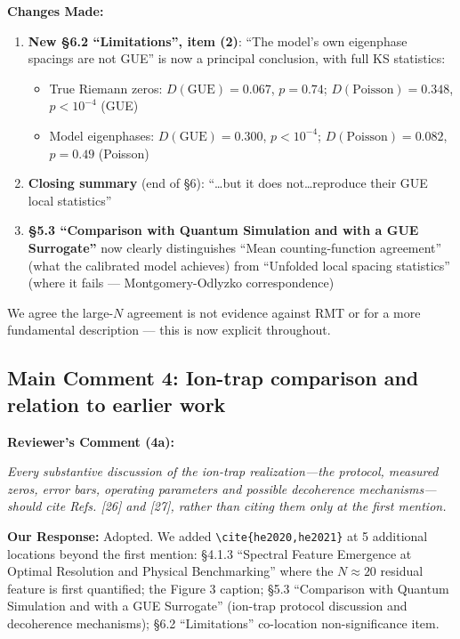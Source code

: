 \documentclass[11pt]{article}
\begin{document}
\noindent\textbf{Changes Made:}
\begin{enumerate}
\item \textbf{New \S6.2 ``Limitations'', item (2)}: ``The model's own eigenphase spacings are not GUE'' is now a principal conclusion, with full KS statistics:
\begin{itemize}
\item True Riemann zeros: $D(\text{GUE})=0.067$, $p=0.74$; $D(\text{Poisson})=0.348$, $p<10^{-4}$ (GUE)
\item Model eigenphases: $D(\text{GUE})=0.300$, $p<10^{-4}$; $D(\text{Poisson})=0.082$, $p=0.49$ (Poisson)
\end{itemize}
\item \textbf{Closing summary} (end of \S6): ``\ldots but it does not\ldots reproduce their GUE local statistics''
\item \textbf{\S5.3 ``Comparison with Quantum Simulation and with a GUE Surrogate''} now clearly distinguishes ``Mean counting-function agreement'' (what the calibrated model achieves) from ``Unfolded local spacing statistics'' (where it fails --- Montgomery-Odlyzko correspondence)
\end{enumerate}

\noindent We agree the large-$N$ agreement is not evidence against RMT or for a more fundamental description --- this is now explicit throughout.

\subsection*{Main Comment 4: Ion-trap comparison and relation to earlier work}

\noindent\textbf{Reviewer's Comment (4a):}
\begin{quotebox}
\itshape Every substantive discussion of the ion-trap realization---the protocol, measured zeros, error bars, operating parameters and possible decoherence mechanisms---should cite Refs. [26] and [27], rather than citing them only at the first mention.
\end{quotebox}

\noindent\textbf{Our Response:} Adopted. We added \texttt{\textbackslash cite\{he2020,he2021\}} at 5 additional locations beyond the first mention: \S4.1.3 ``Spectral Feature Emergence at Optimal Resolution and Physical Benchmarking'' where the $N\approx20$ residual feature is first quantified; the Figure 3 caption; \S5.3 ``Comparison with Quantum Simulation and with a GUE Surrogate'' (ion-trap protocol discussion and decoherence mechanisms); \S6.2 ``Limitations'' co-location non-significance item.
\end{document}

